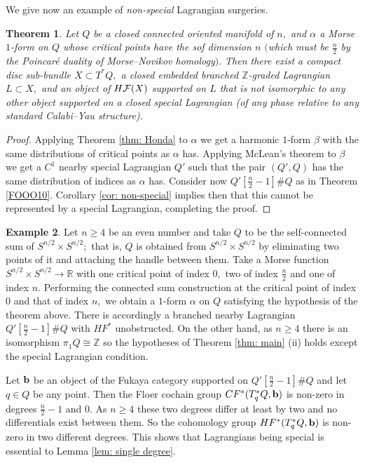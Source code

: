 \documentclass{article}
\theoremstyle{plain}%
\newtheorem{thm}{Theorem}[section]
\theoremstyle{definition}
\newtheorem{exam}[thm]{Example}
\numberwithin{equation}{section}
\numberwithin{figure}{section}
\def\l{\label}
\def\ge{\geqslant}
\def\cF{{\mathbin{\cal F}}}
\def\R{{\mathbin{\mathbb R}}}
\def\Z{{\mathbin{\mathbb Z}}}
\def\al{\alpha}
\def\be{\beta}
\def\t{\times}
\begin{document}
We give now an example of {\it non-special} Lagrangian surgeries.
\begin{thm}\l{Ea}
Let $Q$ be a closed connected oriented manifold of $n,$ and $\al$ a Morse $1$-form on $Q$ whose critical points have the sof dimension $n$ $($which must be $\frac n2$ by the Poincar\'e duality of Morse--Novikov homology$).$ Then there exist a compact disc sub-bundle $X\subset T^*Q,$ a closed embedded branched $\Z$-graded Lagrangian $L\subset X,$ and an object of $H\cF(X)$ supported on $L$ that is not isomorphic to any other object supported on a closed special Lagrangian (of any phase
relative to any standard Calabi--Yau structure).
\end{thm}
\begin{proof}
Applying Theorem \ref{thm: Honda} to $\al$ we get a harmonic $1$-form $\be$ with the same distributions of critical points as $\al$ has.
Applying McLean's theorem to $\be$ we get a $C^1$ nearby special Lagrangian $Q'$ such that the pair $(Q',Q)$ has the same distribution of indices as $\al$ has.
Consider now $Q'[\frac n2-1]\#Q$ as in Theorem \ref{FOOO10}.
Corollary \ref{cor: non-special} implies then that this cannot be represented by a special Lagrangian, completing the proof.
\end{proof}
\begin{exam}\l{ex: non-special}
Let $n\ge 4$ be an even number and take $Q$ to be the self-connected sum of $S^{n/2}\t S^{n/2};$ that is, $Q$ is obtained from $S^{n/2}\t S^{n/2}$ by eliminating two points of it and attaching the handle between them.
Take a Morse function $S^{n/2}\t S^{n/2}\to\R$ with one critical point of index $0,$ two of index $\frac n2$ and one of index $n.$ Performing the connected sum construction at the critical point of index $0$ and that of index $n,$ we obtain a $1$-form $\al$ on $Q$ satisfying the hypothesis of the theorem above. There is accordingly a branched nearby Lagrangian $Q'[\frac n2-1]\#Q$ with $HF^*$ unobstructed. 
On the other hand, as $n\ge 4$ there is an isomorphism $\pi_1Q\cong\Z$ so the hypotheses of Theorem \ref{thm: main} (ii) holds except the special Lagrangian condition.

Let ${\mathbf{b}}$ be an object of the Fukaya category supported on $Q'[\frac n2-1]\#Q$ and let $q\in Q$ be any point. Then the Floer cochain group $CF^*(T_q^*Q,{\mathbf{b}})$ is non-zero in degrees $\frac n2-1$ and $0.$ As $n\ge4$ these two degrees differ at least by two and no differentials exist between them. So the cohomology group $HF^*(T_q^*Q,{\mathbf{b}})$ is non-zero in two different degrees. This shows that Lagrangians being special is essential to Lemma \ref{lem: single degree}.
\end{exam}
\end{document}

